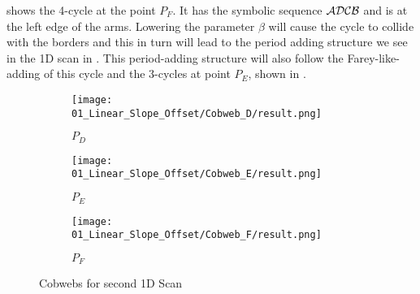  shows the 4-cycle at the point $P_F$.
It has the symbolic sequence $\mathcal{A}\mathcal{D}\mathcal{C}\mathcal{B}$ and is at the left edge of the arms.
Lowering the parameter $\beta$ will cause the cycle to collide with the borders and this in turn will lead to the period adding structure we see in the 1D scan in .
This period-adding structure will also follow the Farey-like-adding of this cycle and the 3-cycles at point $P_E$, shown in .

\begin{figure}
    \centering
    \begin{subfigure}{0.3\textwidth}
        \centering
        \texttt{[image: 01\_Linear\_Slope\_Offset/Cobweb\_D/result.png]}
        \caption{$P_D$}
        \label{fig:pcw.lin.CobwebD}
    \end{subfigure}
    \begin{subfigure}{0.3\textwidth}
        \centering
        \texttt{[image: 01\_Linear\_Slope\_Offset/Cobweb\_E/result.png]}
        \caption{$P_E$}
        \label{fig:pcw.lin.CobwebE}
    \end{subfigure}
    \begin{subfigure}{0.3\textwidth}
        \centering
        \texttt{[image: 01\_Linear\_Slope\_Offset/Cobweb\_F/result.png]}
        \caption{$P_F$}
        \label{fig:pcw.lin.CobwebF}
    \end{subfigure}
    \caption{Cobwebs for second 1D Scan}
    \label{fig:pcw.lin.CobwebD-F}
\end{figure}
